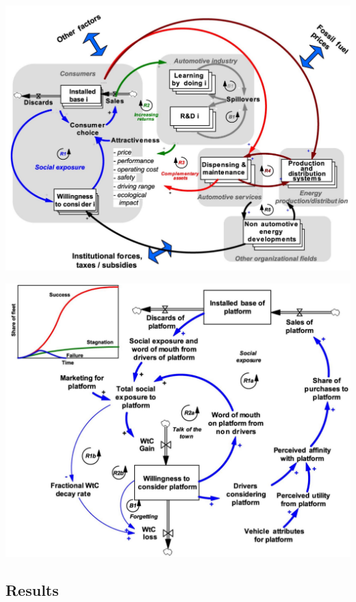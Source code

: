 \documentclass{beamer}
\begin{document}
\begin{frame}
  \includegraphics[height=\textheight]{Sterman-fig-2.jpg}
\end{frame}
    
\begin{frame}
  \includegraphics[height=\textheight]{Sterman-fig-3.jpg}
\end{frame}

\subsection{Results}
\end{document}
